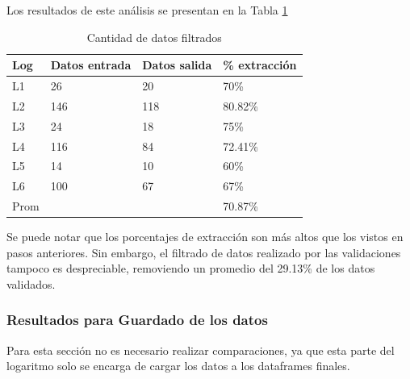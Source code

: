 Los resultados de este análisis se presentan en la Tabla \ref{table:etapa3}

\begin{table}[h]
    \centering
    \ttfamily
    \caption{\label{table:etapa3} Cantidad de datos filtrados}
    \begin{tabular}{|p{3.5cm}|p{3.5cm}|p{3.5cm}|p{3.5cm}|}
        \hline
        Log & Datos entrada & Datos salida & \% extracción \\
        \hline
        L1 & 26 & 20 & 70\% \\
        \hline
        L2 & 146 & 118 & 80.82\% \\
        \hline
        L3 & 24 & 18 & 75\% \\
        \hline        
        L4 & 116 & 84 & 72.41\% \\
        \hline
        L5 & 14 & 10 & 60\% \\
        \hline
        L6 & 100 & 67 & 67\% \\
        \hline
        Prom &  &  & 70.87\% \\
        \hline
    \end{tabular}
\end{table}

Se puede notar que los porcentajes de extracción son más altos que los vistos en pasos anteriores. Sin embargo, el filtrado de datos realizado por las validaciones tampoco es despreciable, removiendo un promedio del 29.13\% de los datos validados.

\subsubsection{Resultados para Guardado de los datos}

Para esta sección no es necesario realizar comparaciones, ya que esta parte del logaritmo solo se encarga de cargar los datos a los dataframes finales.